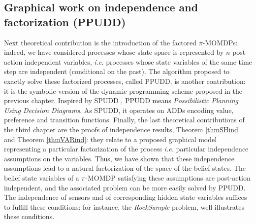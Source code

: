 \subsection*{Graphical work on independence and factorization (PPUDD)}
Next theoretical contribution is 
the introduction of the factored $\pi$-MOMDPs:
indeed, we have considered processes
whose state space is represented by $n$ 
post-action independent variables,
\textit{i.e.} processes whose 
state variables of the same time step
are independent (conditional on the past).
The algorithm proposed to exactly solve 
these factorized processes,
called PPUDD, is another contribution:
it is the symbolic version of 
the dynamic programming scheme 
proposed in the previous chapter.
Inspired by SPUDD \cite{Hoey99spudd:stochastic}, 
PPUDD means \emph{Possibilistic Planning Using Decision Diagrams}. 
As SPUDD, it operates on ADDs 
encoding value, preference and transition functions.
Finally, the last theoretical contributions of the third chapter
are the proofs of independence results,
Theorem \ref{thmSHind} and Theorem \ref{thmVARind}:
they relate to a proposed graphical model
representing a particular factorization of the process
\textit{i.e.} particular independence assumptions
on the variables.
Thus, we have shown that 
these independence assumptions
lead to a natural factorization 
of the space of the belief states.
The belief state variables of a $\pi$-MOMDP 
satisfying these assumptions
are post-action independent,
and the associated problem 
can be more easily solved by PPUDD. 
The independence of sensors 
and of corresponding hidden state variables 
suffices to fulfill these conditions:
for instance, the \textit{RockSample} problem, 
well illustrates these conditions.

